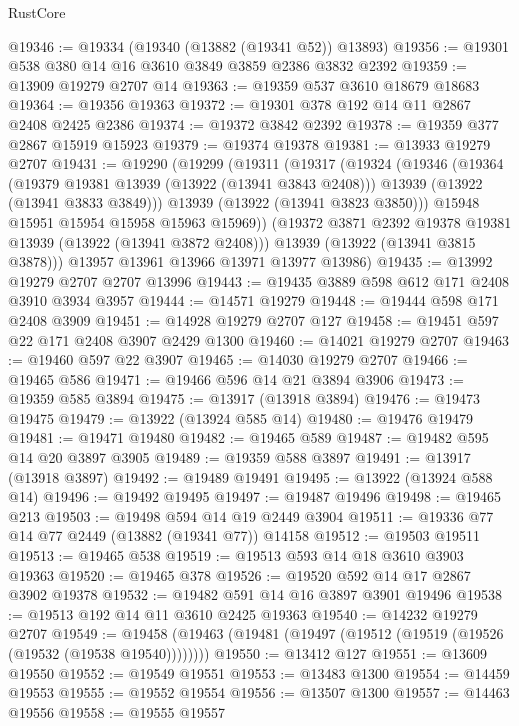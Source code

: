 \begin{lexlean}{RustCore}
\begin{coremodule}
@19346 := @19334 (@19340 (@13882 (@19341 @52)) @13893)
@19356 := @19301 @538 @380 @14 @16 @3610 @3849 @3859 @2386 @3832 @2392
@19359 := @13909 @19279 @2707 @14
@19363 := @19359 @537 @3610 @18679 @18683
@19364 := @19356 @19363
@19372 := @19301 @378 @192 @14 @11 @2867 @2408 @2425 @2386
@19374 := @19372 @3842 @2392
@19378 := @19359 @377 @2867 @15919 @15923
@19379 := @19374 @19378
@19381 := @13933 @19279 @2707
@19431 := @19290
    (@19299
      (@19311
        (@19317
          (@19324
            (@19346
              (@19364
                (@19379 @19381 @13939 (@13922 (@13941 @3843 @2408)))
                @13939
                (@13922 (@13941 @3833 @3849)))
              @13939
              (@13922 (@13941 @3823 @3850)))
            @15948
            @15951
            @15954
            @15958
            @15963
            @15969))
        (@19372 @3871 @2392 @19378 @19381 @13939 (@13922 (@13941 @3872 @2408)))
        @13939
        (@13922 (@13941 @3815 @3878)))
      @13957
      @13961
      @13966
      @13971
      @13977
      @13986)
@19435 := @13992 @19279 @2707 @2707 @13996
@19443 := @19435 @3889 @598 @612 @171 @2408 @3910 @3934 @3957
@19444 := @14571 @19279
@19448 := @19444 @598 @171 @2408 @3909
@19451 := @14928 @19279 @2707 @127
@19458 := @19451 @597 @22 @171 @2408 @3907 @2429 @1300
@19460 := @14021 @19279 @2707
@19463 := @19460 @597 @22 @3907
@19465 := @14030 @19279 @2707
@19466 := @19465 @586
@19471 := @19466 @596 @14 @21 @3894 @3906
@19473 := @19359 @585 @3894
@19475 := @13917 (@13918 @3894)
@19476 := @19473 @19475
@19479 := @13922 (@13924 @585 @14)
@19480 := @19476 @19479
@19481 := @19471 @19480
@19482 := @19465 @589
@19487 := @19482 @595 @14 @20 @3897 @3905
@19489 := @19359 @588 @3897
@19491 := @13917 (@13918 @3897)
@19492 := @19489 @19491
@19495 := @13922 (@13924 @588 @14)
@19496 := @19492 @19495
@19497 := @19487 @19496
@19498 := @19465 @213
@19503 := @19498 @594 @14 @19 @2449 @3904
@19511 := @19336 @77 @14 @77 @2449 (@13882 (@19341 @77)) @14158
@19512 := @19503 @19511
@19513 := @19465 @538
@19519 := @19513 @593 @14 @18 @3610 @3903 @19363
@19520 := @19465 @378
@19526 := @19520 @592 @14 @17 @2867 @3902 @19378
@19532 := @19482 @591 @14 @16 @3897 @3901 @19496
@19538 := @19513 @192 @14 @11 @3610 @2425 @19363
@19540 := @14232 @19279 @2707
@19549 := @19458 (@19463 (@19481 (@19497 (@19512 (@19519 (@19526 (@19532 (@19538 @19540))))))))
@19550 := @13412 @127
@19551 := @13609 @19550
@19552 := @19549 @19551
@19553 := @13483 @1300
@19554 := @14459 @19553
@19555 := @19552 @19554
@19556 := @13507 @1300
@19557 := @14463 @19556
@19558 := @19555 @19557

\end{coremodule}
\end{lexlean}

